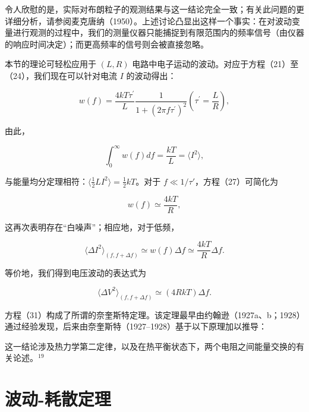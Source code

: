 令人欣慰的是，实际对布朗粒子的观测结果与这一结论完全一致；有关此问题的更详细分析，请参阅麦克唐纳（1950）。上述讨论凸显出这样一个事实：在对波动变量进行观测的过程中，我们的测量仪器只能捕捉到有限范围内的频率信号（由仪器的响应时间决定）；而更高频率的信号则会被直接忽略。

本节的理论可轻松应用于 \((L,R)\) 电路中电子运动的波动。对应于方程（21）至（24），我们现在可以针对电流 \(I\) 的波动得出：

\begin{equation}\tag{15.4.47}\label{eq:15.4.47}
w ( f ) = \frac { 4 k T \tau ^{\prime} } { L } \frac { 1 } { 1 + ( 2 \pi f \tau ^{\prime} ) ^{2} }  \left( \tau ^{\prime} = \frac { L } { R } \right) ,
\end{equation}

由此，

\begin{equation}\tag{15.4.48}\label{eq:15.4.48}
\int _ { 0 } ^{\infty} w ( f ) d f = \frac { k T } { L } = \langle I ^{2} \rangle ,
\end{equation}

与能量均分定理相符：\(\langle\frac{1}{2}LI^{2}\rangle=\frac{1}{2}kT\)。对于 \(f \ll 1/\tau'\)，方程（27）可简化为

\begin{equation}\tag{15.4.49}\label{eq:15.4.49}
w ( f ) \simeq \frac { 4 k T } { R } ,
\end{equation}

这再次表明存在``白噪声''；相应地，对于低频，

\begin{equation}\tag{15.4.50}\label{eq:15.4.50}
\langle \Delta I ^{2} \rangle _ { ( f , f + \Delta f ) } \simeq w ( f ) \Delta f \simeq \frac { 4 k T } { R } \Delta f .
\end{equation}

等价地，我们得到电压波动的表达式为

\begin{equation}\tag{15.4.51}\label{eq:15.4.51}
\langle \Delta V ^{2} \rangle _ { ( f , f + \Delta f ) } \simeq ( 4 R k T ) \Delta f .
\end{equation}

方程（31）构成了所谓的奈奎斯特定理。该定理最早由约翰逊（1927a、b；1928）通过经验发现，后来由奈奎斯特（1927--1928）基于以下原理加以推导：

这一结论涉及热力学第二定律，以及在热平衡状态下，两个电阻之间能量交换的有关论述。\(^{19}\)

\section{波动-耗散定理}\label{ux6ce2ux52a8-ux8017ux6563ux5b9aux7406}

